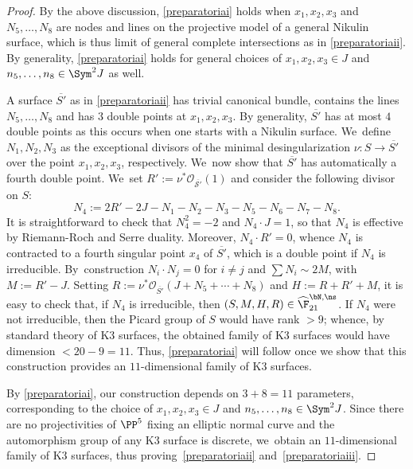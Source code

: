 \begin{proof}
By the above discussion, \eqref{preparatoriai} holds when $x_1,x_2,x_3$ and $N_5,\ldots,N_8$ are nodes and lines on the projective model of a general Nikulin surface, which is thus limit of general complete intersections as in \eqref{preparatoriaii}. By generality, \eqref{preparatoriai} holds for general choices of $x_1,x_2,x_3\in J$ and $n_5,\ldots,n_8\in \Sym^2J$ as well.

A surface $\overline{S'}$ as in \eqref{preparatoriaii} has trivial canonical bundle, contains the lines $N_5,\ldots, N_8$ and has $3$ double points at $x_1,x_2,x_3$. By generality, $\overline{S'}$ has at most $4$ double points as this occurs when one starts with a Nikulin surface. We~define $N_1,N_2,N_3$ as the exceptional divisors of the minimal desingularization $\nu:S\to \overline{S'}$ over the point $x_1,x_2,x_3$, respectively. We~now show that $\overline{S'}$ has automatically a fourth double point. We~set $R':=\nu^*\mathcal{O_{\overline{S'}}}(1)$ and consider the following divisor on $S$:
\[
N_4:=2R'-2J-N_1-N_2-N_3-N_5-N_6-N_7-N_8.
\]
It is straightforward to check that $N_4^2=-2$ and $N_4 \cdot J=1$, so that $N_4$ is effective by Riemann-Roch and Serre duality. Moreover,
$N_4\cdot R'=0$, whence $N_4$ is contracted to a fourth singular point $x_4$ of $\overline{S'}$, which is a double point if $N_4$ is irreducible. By~construction $N_i\cdot N_j=0$ for $i\neq j$ and $\sum N_i \sim 2M$, with $M:=R'-J$. Setting $R:=\nu^*\mathcal{O}_{\overline{S'}}(J+N_5+\cdots+N_8)$ and $H:=R+R'+M$, it is easy to check that, if $N_4$ is irreducible, then $(S,M,H,R)\in \widehat{\F}_{21}^{\bN,\ns}$. If $N_4$ were not irreducible, then the Picard group of $S$ would have rank $>9$; whence, by standard theory of K3 surfaces, the obtained family of K3 surfaces would have dimension $<20-9=11$. Thus, \eqref{preparatoriai} will follow once we show that this construction provides an $11$-dimensional family of K3 surfaces.

By \eqref{preparatoriai}, our construction depends on $3+8=11$ parameters, corresponding to the choice of $x_1,x_2,x_3\in J$ and $n_5,\ldots,n_8\in\Sym^2J$. Since there are no projectivities of $\PP^5$ fixing an elliptic normal curve and the automorphism group of any K3 surface is discrete, we~obtain an $11$-dimensional family of K3 surfaces, thus proving~\eqref{preparatoriaii} and~\eqref{preparatoriaiii}.
\end{proof}

